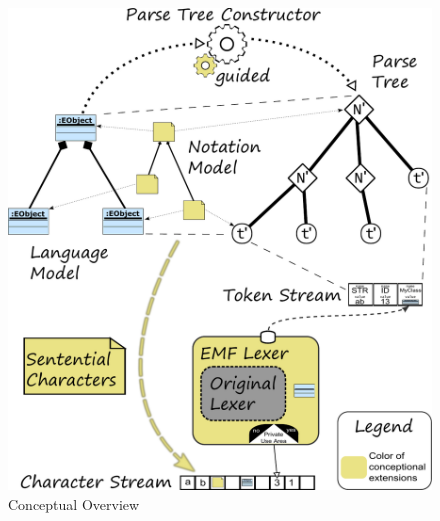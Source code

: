 \begin{figure}
\centering
\includegraphics[scale=0.75]{gfx/ex/Concept} 
\caption{Conceptual Overview}
\label{ConceptFigure}
\end{figure}
